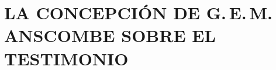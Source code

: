 \documentclass[./main.tex]{subfiles}
\begin{document}
\setcounter{chapter}{2}

\chapter{LA CONCEPCIÓN DE G.\,E.\,M.\,ANSCOMBE SOBRE EL TESTIMONIO}




\end{document}
